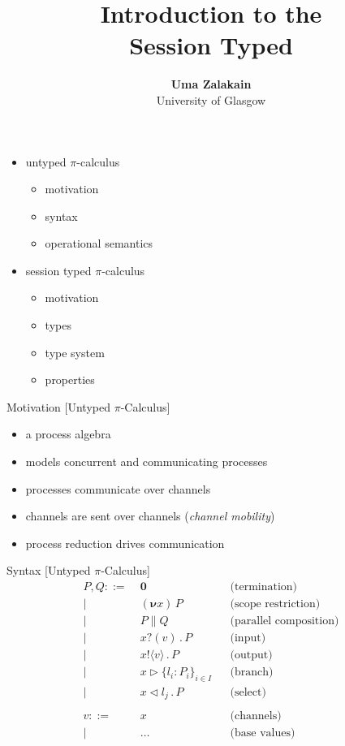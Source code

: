 \documentclass[dvipsnames]{beamer}
\date{}
\title{Introduction to the\\ Session Typed \Picalc{}}
\author{\textbf{Uma Zalakain}\\ University of Glasgow}
\newcommand{\sitem}{\item[\raisebox{.45ex}{\rule{.6ex}{.6ex}}]}
\newcommand{\picalc}{$\pi$-calculus}
\newcommand{\Picalc}{$\pi$-Calculus}
\newcommand{\PO}{\textbf{0}}
\newcommand{\comp}[2]{#1 \parallel #2}
\newcommand{\new}[1]{(\boldsymbol{\nu} #1) \,}
\newcommand{\send}[2]{#1 !\langle #2 \rangle \, . \,}
\newcommand{\recv}[2]{#1 ?( #2 ) \, . \,}
\newcommand{\branch}[3]{#1 \triangleright \{ #2 \}_{#3}}
\newcommand{\select}[2]{#1 \triangleleft #2 \, . \,}
\newcommand{\slidetitle}[2]{#2 \hspace*{\fill} [#1]}
\begin{document}
  \maketitle

  \begin{frame}
    \begin{itemize}
      \setlength\itemsep{1em}
      \sitem untyped \picalc{}
        \begin{itemize}
          \sitem motivation
          \sitem syntax
          \sitem operational semantics
        \end{itemize}
      \sitem session typed \picalc{}
        \begin{itemize}
          \sitem motivation
          \sitem types
          \sitem type system
          \sitem properties
        \end{itemize}
    \end{itemize}
  \end{frame}

  \begin{frame}{\slidetitle{Untyped \Picalc{}}{Motivation}}
    \begin{itemize}
      \setlength\itemsep{1em}
      \sitem a process algebra
      \sitem models concurrent and communicating processes
      \sitem processes communicate over channels
      \sitem channels are sent over channels (\emph{channel mobility})
      \sitem process reduction drives communication
    \end{itemize}
  \end{frame}
  
  \begin{frame}{\slidetitle{Untyped \Picalc{}}{Syntax}}
    \begin{align*}
        P, Q ::=& \; \PO                     &&\text{(termination)}    \\ 
        |& \; \new{x}P                       &&\text{(scope restriction)} \\ 
        |& \; \comp{P}{Q}                    &&\text{(parallel composition)} \\ 
        |& \; \recv{x}{v}P                   &&\text{(input)}       \\ 
        |& \; \send{x}{v}P                   &&\text{(output)}       \\           
        |& \; \branch{x}{l_i : P_i}{i \in I} &&\text{(branch)}       \\ 
        |& \; \select{x}{l_j}P               &&\text{(select)}       \\           
        \\
        v ::=& \; x && \text{(channels)}\\
        | & \; \ldots && \text{(base values)}\\
    \end{align*}
  \end{frame}
\end{document}
